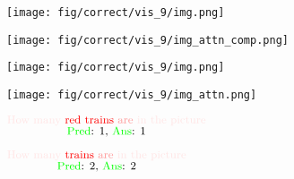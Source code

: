 \documentclass{article} \usepackage[dvipsnames,table]{xcolor}
\begin{document}
\begin{figure}[t]

\centering
    \begin{minipage}[t]{0.47\linewidth}
        \begin{minipage}{0.47\linewidth}
            \centering
            \texttt{[image: fig/correct/vis\_9/img.png]}
        \end{minipage}
        \begin{minipage}{0.47\linewidth}
            \centering
            \texttt{[image: fig/correct/vis\_9/img\_attn\_comp.png]}
        \end{minipage}
    \end{minipage}
    \begin{minipage}[t]{0.47\linewidth}
        \begin{minipage}{0.47\linewidth}
            \centering
            \texttt{[image: fig/correct/vis\_9/img.png]}
        \end{minipage}
        \begin{minipage}{0.47\linewidth}
            \centering
            \texttt{[image: fig/correct/vis\_9/img\_attn.png]}
        \end{minipage}
    \end{minipage}
    
    \centering
    \begin{minipage}[t]{0.47\linewidth}
        \centering
        $\substack{
            \text{\small {\color[rgb]{1,0.9,0.9}How many} {\color[rgb]{1,0,0}red trains} {\color[rgb]{1,0.6,0.6}are} {\color[rgb]{1,0.9,0.9}in the picture}} \\
            \text{\small {{\color[rgb]{0,1,0}Pred}: 1, {\color[rgb]{0,1,0}Ans}: 1}}
            }$
    \end{minipage}
    \begin{minipage}[t]{0.47\linewidth}
        \centering
        $\substack{
            \text{\small {\color[rgb]{1,0.9,0.9}How many} {\color[rgb]{1,0,0}trains} {\color[rgb]{1,0.6,0.6}are} {\color[rgb]{1,0.9,0.9}in the picture}} \\
            \text{\small {{\color[rgb]{0,1,0}Pred}: 2, {\color[rgb]{0,1,0}Ans}: 2}}
            }$
    \end{minipage}
    

\end{figure}
\end{document}
